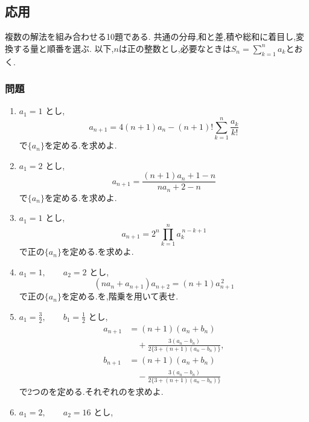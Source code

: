 \subsection{応用}\label{節：応用}
複数の解法を組み合わせる10題である.
共通の分母,和と差,積や総和に着目し,変換する量と順番を選ぶ.
以下,$n$は正の整数とし,必要なときは$S_n=\sum_{k=1}^{n}a_k$とおく.

\subsubsection{問題}\label{節：応用：問題}
\begin{enumerate}[label=\textbf{問\arabic*.},leftmargin=3.8em,format=\bookitemlink{practice-advanced}{problem}{hint}]
  \item $a_1=1$ とし,
    \[
      a_{n+1}
      =4(n+1)a_n
      -(n+1)!\sum_{k=1}^{n}\frac{a_k}{k!}
    \]
    で$\{a_n\}$を定める.を求めよ.
  \item $a_1=2$ とし,
    \[
      a_{n+1}
      =\frac{(n+1)a_n+1-n}{na_n+2-n}
    \]
    で$\{a_n\}$を定める.を求めよ.
  \item $a_1=1$ とし,
    \[
      a_{n+1}
      =2^n\prod_{k=1}^{n}a_k^{\,n-k+1}
    \]
    で正の$\{a_n\}$を定める.を求めよ.
  \item $a_1=1,\qquad a_2=2$ とし,
    \[
      (na_n+a_{n+1})a_{n+2}
      =(n+1)a_{n+1}^{\,2}
    \]
    で正の$\{a_n\}$を定める.を,階乗を用いて表せ.
  \item $a_1=\frac32,\qquad b_1=\frac12$ とし,
    \begin{align*}
      a_{n+1}
      &=(n+1)(a_n+b_n)\\
      &\quad+\frac{3(a_n-b_n)}
      {2\{3+(n+1)(a_n-b_n)\}},\\
      b_{n+1}
      &=(n+1)(a_n+b_n)\\
      &\quad-\frac{3(a_n-b_n)}
      {2\{3+(n+1)(a_n-b_n)\}}
    \end{align*}
    で2つのを定める.それぞれのを求めよ.
  \item $a_1=2,\qquad a_2=16$ とし,

\end{enumerate}
